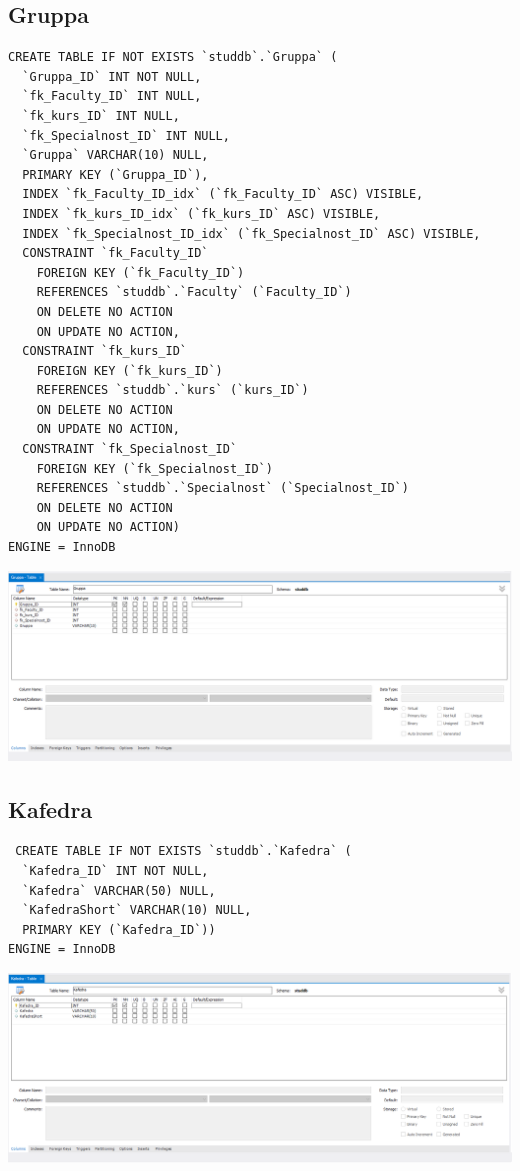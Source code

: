 \documentclass[a4paper, 12pt]{article}
\begin{document}
\subsection{Gruppa}
\begin{lstlisting}
CREATE TABLE IF NOT EXISTS `studdb`.`Gruppa` (
  `Gruppa_ID` INT NOT NULL,
  `fk_Faculty_ID` INT NULL,
  `fk_kurs_ID` INT NULL,
  `fk_Specialnost_ID` INT NULL,
  `Gruppa` VARCHAR(10) NULL,
  PRIMARY KEY (`Gruppa_ID`),
  INDEX `fk_Faculty_ID_idx` (`fk_Faculty_ID` ASC) VISIBLE,
  INDEX `fk_kurs_ID_idx` (`fk_kurs_ID` ASC) VISIBLE,
  INDEX `fk_Specialnost_ID_idx` (`fk_Specialnost_ID` ASC) VISIBLE,
  CONSTRAINT `fk_Faculty_ID`
    FOREIGN KEY (`fk_Faculty_ID`)
    REFERENCES `studdb`.`Faculty` (`Faculty_ID`)
    ON DELETE NO ACTION
    ON UPDATE NO ACTION,
  CONSTRAINT `fk_kurs_ID`
    FOREIGN KEY (`fk_kurs_ID`)
    REFERENCES `studdb`.`kurs` (`kurs_ID`)
    ON DELETE NO ACTION
    ON UPDATE NO ACTION,
  CONSTRAINT `fk_Specialnost_ID`
    FOREIGN KEY (`fk_Specialnost_ID`)
    REFERENCES `studdb`.`Specialnost` (`Specialnost_ID`)
    ON DELETE NO ACTION
    ON UPDATE NO ACTION)
ENGINE = InnoDB  
\end{lstlisting}
\includegraphics[width=\textwidth]{2-6.png}

\subsection{Kafedra}
\begin{lstlisting}
 CREATE TABLE IF NOT EXISTS `studdb`.`Kafedra` (
  `Kafedra_ID` INT NOT NULL,
  `Kafedra` VARCHAR(50) NULL,
  `KafedraShort` VARCHAR(10) NULL,
  PRIMARY KEY (`Kafedra_ID`))
ENGINE = InnoDB 
\end{lstlisting}
\includegraphics[width=\textwidth]{2-7.png}
\end{document}
